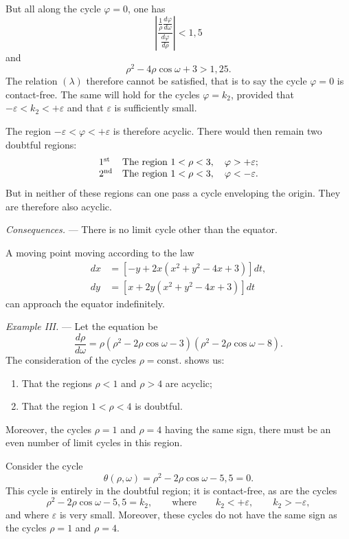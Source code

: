 \documentclass[11pt]{article}
\begin{document}
But all along the cycle $\varphi=0$, one has
\[
\left|\frac{\frac1\rho\frac{d\varphi}{d\omega}}{\frac{d\varphi}{d\rho}}\right|<1{,}5
\]
and
\[
\rho^2-4\rho\cos\omega+3>1{,}25.
\]
The relation $(\lambda)$ therefore cannot be satisfied, that is to say the cycle $\varphi=0$ is contact-free. The same will hold for the cycles $\varphi=k_2$, provided that $-\varepsilon<k_2<+\varepsilon$ and that $\varepsilon$ is sufficiently small.

The region $-\varepsilon<\varphi<+\varepsilon$ is therefore acyclic. There would then remain two doubtful regions:
\[
\begin{array}{ll}
1\textsuperscript{st} & \text{The region }1<\rho<3,\quad \varphi>+\varepsilon;\\
2\textsuperscript{nd} & \text{The region }1<\rho<3,\quad \varphi<-\varepsilon.
\end{array}
\]
But in neither of these regions can one pass a cycle enveloping the origin. They are therefore also acyclic.

\emph{Consequences.} --- There is no limit cycle other than the equator.

A moving point moving according to the law
\[
\begin{aligned}
dx&=[-y+2x(x^2+y^2-4x+3)]dt,\\
dy&=[x+2y(x^2+y^2-4x+3)]dt
\end{aligned}
\]
can approach the equator indefinitely.

\emph{Example III.} --- Let the equation be
\[
\frac{d\rho}{d\omega}=\rho(\rho^2-2\rho\cos\omega-3)(\rho^2-2\rho\cos\omega-8).
\]
The consideration of the cycles $\rho=\mathrm{const.}$ shows us:
\begin{enumerate}[label=\arabic*., leftmargin=3em]
\item That the regions $\rho<1$ and $\rho>4$ are acyclic;
\item That the region $1<\rho<4$ is doubtful.
\end{enumerate}

Moreover, the cycles $\rho=1$ and $\rho=4$ having the same sign, there must be an even number of limit cycles in this region.

Consider the cycle
\[
\theta(\rho,\omega)=\rho^2-2\rho\cos\omega-5{,}5=0.
\]
This cycle is entirely in the doubtful region; it is contact-free, as are the cycles
\[
\rho^2-2\rho\cos\omega-5{,}5=k_2,
\qquad\text{where}\qquad
k_2<+\varepsilon,
\qquad
k_2>-\varepsilon,
\]
and where $\varepsilon$ is very small. Moreover, these cycles do not have the same sign as the cycles $\rho=1$ and $\rho=4$.
\end{document}
